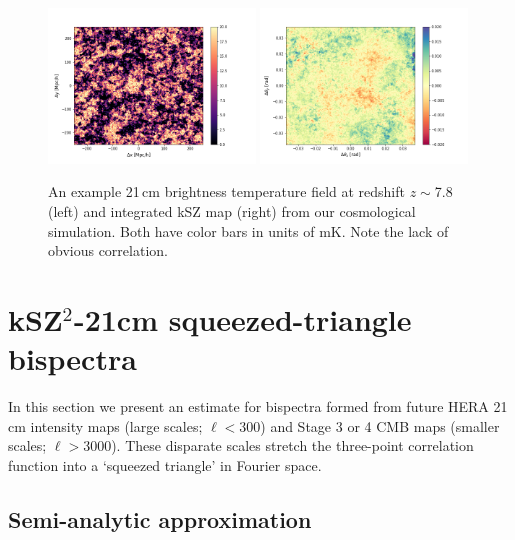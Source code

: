\begin{figure}
\centering
\includegraphics[width=0.49\textwidth]{chapters/ksz_21cm/figures/21cmExample_z7p8.png}
\includegraphics[width=0.49\textwidth]{chapters/ksz_21cm/figures/kszmap.png}
\caption[An example 21\,cm brightness temperature field and integrated kSZ map from our cosmological simulation.]{An example 21\,cm brightness temperature field at redshift $z\sim$7.8 (left) and integrated kSZ map (right) from our cosmological simulation. Both have color bars in units of mK. Note the lack of obvious correlation.}
\label{fig:ksz_21cm_sim_example}
\end{figure}

\section{kSZ$^2$-21cm squeezed-triangle bispectra}
\label{sec:bispec}

In this section we present an estimate for bispectra formed from future HERA 21\,cm intensity maps (large scales; $\ell < 300$) and Stage 3 or 4 CMB maps (smaller scales; $\ell > 3000$). These disparate scales stretch the three-point correlation function into a `squeezed triangle' in Fourier space.

\subsection{Semi-analytic approximation}
\label{subsec:ksz_21cm_semi_analytic_approximation}

